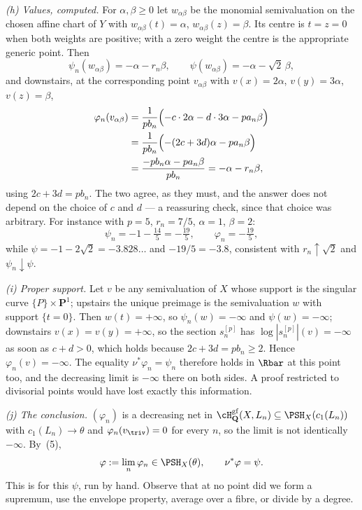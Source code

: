 \begin{example}
\emph{(h) Values, computed.}  For $\alpha,\beta\ge0$ let $w_{\alpha\beta}$
be the monomial semivaluation on the chosen affine chart of $Y$ with
$w_{\alpha\beta}(t)=\alpha$, $w_{\alpha\beta}(z)=\beta$.
Its centre is $t=z=0$ when both weights are positive; with a zero
weight the centre is the appropriate generic point.  Then
\[
 \psi_n(w_{\alpha\beta})=-\alpha-r_n\beta,
 \qquad
 \psi(w_{\alpha\beta})=-\alpha-\sqrt2\,\beta,
\]
and downstairs, at the corresponding point $v_{\alpha\beta}$ with
$v(x)=2\alpha$, $v(y)=3\alpha$, $v(z)=\beta$,
\[
 \begin{aligned}
 \varphi_n(v_{\alpha\beta})
 &=\frac1{pb_n}\Bigl(-c\cdot2\alpha-d\cdot3\alpha-pa_n\beta\Bigr)\\
 &=\frac1{pb_n}\Bigl(-(2c+3d)\alpha-pa_n\beta\Bigr)\\
 &=\frac{-pb_n\alpha-pa_n\beta}{pb_n}
  =-\alpha-r_n\beta,
 \end{aligned}
\]
using $2c+3d=pb_n$.  The two agree, as they must, and the answer does not
depend on the choice of $c$ and $d$ --- a reassuring check, since that
choice was arbitrary.  For
instance with $p=5$, $r_n=7/5$, $\alpha=1$, $\beta=2$:
\[
 \psi_n=-1-\tfrac{14}5=-\tfrac{19}5,
 \qquad
 \varphi_n=-\tfrac{19}5,
\]
while $\psi=-1-2\sqrt2=-3.828\ldots$ and $-19/5=-3.8$, consistent with
$r_n\uparrow\sqrt2$ and $\psi_n\downarrow\psi$.

\emph{(i) Proper support.}  Let $v$ be any semivaluation of $X$ whose
support is the singular curve $\{P\}\times\mathbf P^1$; upstairs the unique
preimage is the semivaluation $w$ with support $\{t=0\}$.  Then
$w(t)=+\infty$, so $\psi_n(w)=-\infty$ and $\psi(w)=-\infty$;
downstairs $v(x)=v(y)=+\infty$, so the section $s_n^{[p]}$ has
$\log|s_n^{[p]}|(v)=-\infty$ as soon as $c+d>0$, which holds because
$2c+3d=pb_n\ge2$.  Hence $\varphi_n(v)=-\infty$.  The equality
$\nu^*\varphi_n=\psi_n$ therefore holds in $\Rbar$ at this point too, and
the decreasing limit is $-\infty$ there on both sides.  A proof restricted
to divisorial points would have lost exactly this information.

\emph{(j) The conclusion.}  $(\varphi_n)$ is a decreasing net in
$\cH^{\mathrm{gf}}_{\mathbf Q}(X,L_n)\subseteq\PSH_X(c_1(L_n))$ with
$c_1(L_n)\to\theta$ and $\varphi_n(v_\triv)=0$ for every $n$, so the
limit is not identically $-\infty$.  By
\,(5),
\[
 \varphi:=\lim_n\varphi_n\in\PSH_X(\theta),
 \qquad
 \nu^*\varphi=\psi .
\]
This is  for this $\psi$, run
by hand.  Observe that at no point did we form a supremum, use the envelope
property, average over a fibre, or divide by a degree.
\end{example}

